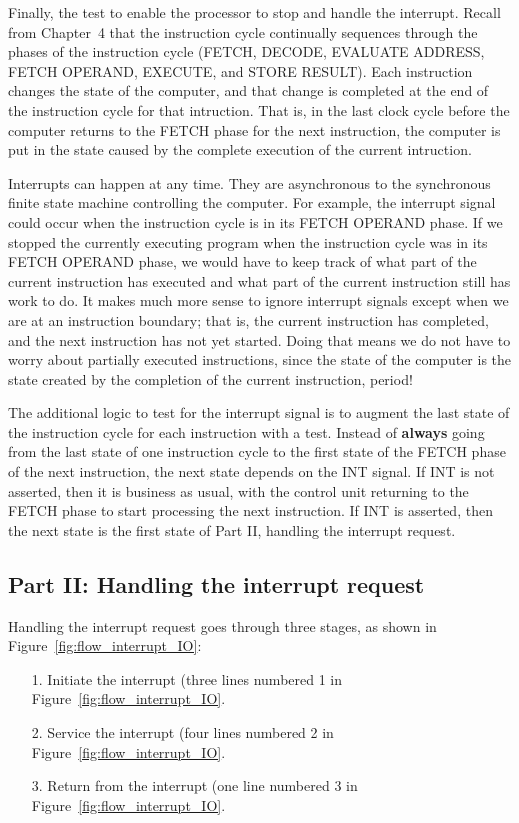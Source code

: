 \documentclass{patt}
\begin{document}
Finally, the test to enable the processor to stop and handle the interrupt.  
Recall
from Chapter~4 that the instruction cycle continually sequences through the 
phases of the instruction cycle (FETCH, DECODE, EVALUATE ADDRESS, FETCH 
OPERAND, EXECUTE, and STORE RESULT). Each instruction changes the state of
the computer, and that change is completed at the end of the instruction
cycle for that intruction.  That is, in the last clock cycle before the 
computer returns to the FETCH phase for the next instruction, the computer 
is put in the state caused by the complete execution of the current intruction.  

Interrupts can happen at any time.  They are asynchronous to the synchronous 
finite state machine controlling the computer.  For example, the interrupt 
signal could occur when the instruction cycle is in its FETCH OPERAND
phase.  If we stopped the currently executing program when the instruction
cycle was in its FETCH OPERAND phase, we would have to keep track of what
part of the current instruction has executed and what part of the current
instruction still has work to do.  It makes much more sense to ignore 
interrupt signals except when we are at an instruction boundary; that is, 
the current instruction has completed, and the next instruction has not yet 
started.  Doing that means we do not have to worry about partially executed 
instructions, since the state of the computer is the state created by the 
completion of the current instruction, period!

The additional logic to test for the interrupt signal is to augment
the last state of the instruction cycle for each instruction with a test.
Instead of {\bf always} going from the last state of one instruction cycle
to the first state of
the FETCH phase of the next instruction, the next state depends on the INT 
signal.  If INT is not asserted, then it is business as usual, with the 
control unit returning to the FETCH phase to start processing the next 
instruction.  If INT is asserted, then the next state is the first state 
of Part II, handling the interrupt request.

\subsection{Part II: Handling the interrupt request}

Handling the interrupt request goes through three
stages, as shown in Figure~\ref{fig:flow_interrupt_IO}:

\begin{enumerate}
\item[1.] Initiate the interrupt (three lines numbered 1 in Figure~\ref{fig:flow_interrupt_IO}.
\item[2.] Service the interrupt (four lines numbered 2 in Figure~\ref{fig:flow_interrupt_IO}.
\item[3.] Return from the interrupt (one line numbered 3 in Figure~\ref{fig:flow_interrupt_IO}.
\end{enumerate}
\end{document}
